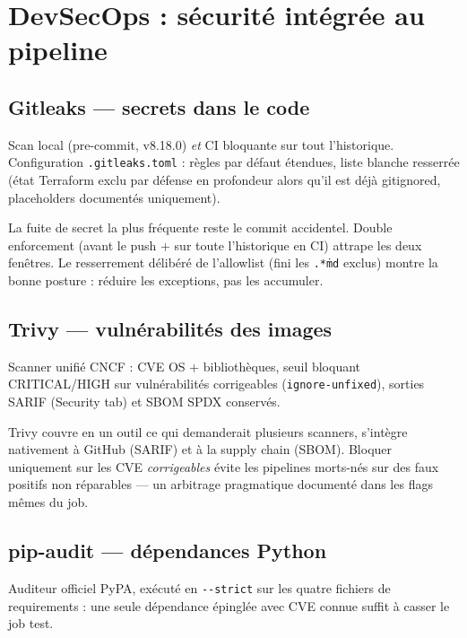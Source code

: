\documentclass[11pt,a4paper]{article}
\begin{document}
\clearpage

\section{DevSecOps : sécurité intégrée au pipeline}

\subsection{Gitleaks --- secrets dans le code}
Scan local (pre-commit, v8.18.0) \emph{et} CI bloquante sur tout l'historique. Configuration \texttt{.gitleaks.toml} : règles par défaut étendues, liste blanche resserrée (état Terraform exclu par défense en profondeur alors qu'il est déjà gitignored, placeholders documentés uniquement).

\begin{whybox}
La fuite de secret la plus fréquente reste le commit accidentel. Double enforcement (avant le push + sur toute l'historique en CI) attrape les deux fenêtres. Le resserrement délibéré de l'allowlist (fini les \texttt{.*\.md} exclus) montre la bonne posture : réduire les exceptions, pas les accumuler.
\end{whybox}

\subsection{Trivy --- vulnérabilités des images}
Scanner unifié CNCF : CVE OS + bibliothèques, seuil bloquant CRITICAL/HIGH sur vulnérabilités corrigeables (\texttt{ignore-unfixed}), sorties SARIF (Security tab) et SBOM SPDX conservés.

\begin{whybox}
Trivy couvre en un outil ce qui demanderait plusieurs scanners, s'intègre nativement à GitHub (SARIF) et à la supply chain (SBOM). Bloquer uniquement sur les CVE \emph{corrigeables} évite les pipelines morts-nés sur des faux positifs non réparables --- un arbitrage pragmatique documenté dans les flags mêmes du job.
\end{whybox}

\subsection{pip-audit --- dépendances Python}
Auditeur officiel PyPA, exécuté en \texttt{-{}-strict} sur les quatre fichiers de requirements : une seule dépendance épinglée avec CVE connue suffit à casser le job test.
\end{document}
